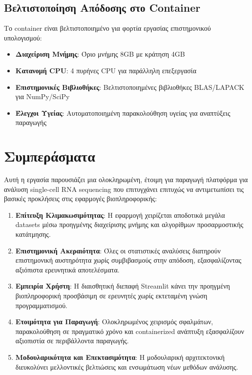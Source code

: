 \documentclass[11pt,a4paper]{article}
\begin{document}
\subsection{Βελτιστοποίηση Απόδοσης στο Container}

Το container είναι βελτιστοποιημένο για φορτία εργασίας επιστημονικού υπολογισμού:

\begin{itemize}
    \item \textbf{Διαχείριση Μνήμης}: Όριο μνήμης 8GB με κράτηση 4GB
    \item \textbf{Κατανομή CPU}: 4 πυρήνες CPU για παράλληλη επεξεργασία
    \item \textbf{Επιστημονικές Βιβλιοθήκες}: Βελτιστοποιημένες βιβλιοθήκες BLAS/LAPACK για NumPy/SciPy
    \item \textbf{Έλεγχοι Υγείας}: Αυτοματοποιημένη παρακολούθηση υγείας για αναπτύξεις παραγωγής
\end{itemize}

\section{Συμπεράσματα}

Αυτή η εργασία παρουσιάζει μια ολοκληρωμένη, έτοιμη για παραγωγή πλατφόρμα για ανάλυση single-cell RNA sequencing που επιτυγχάνει επιτυχώς να αντιμετωπίσει τις βασικές προκλήσεις στις εφαρμογές βιοπληροφορικής:

\begin{enumerate}
    \item \textbf{Επίτευξη Κλιμακωσιμότητας}: Η εφαρμογή χειρίζεται αποδοτικά μεγάλα datasets μέσω προηγμένης διαχείρισης μνήμης και αλγορίθμων προσαρμοστικής κατάτμησης.
    
    \item \textbf{Επιστημονική Ακεραιότητα}: Όλες οι στατιστικές αναλύσεις διατηρούν επιστημονική αυστηρότητα χωρίς συμβιβασμούς στην απόδοση, εξασφαλίζοντας αξιόπιστα ερευνητικά αποτελέσματα.
    
    \item \textbf{Εμπειρία Χρήστη}: Η διαισθητική διεπαφή Streamlit κάνει την προηγμένη βιοπληροφορική προσβάσιμη σε ερευνητές χωρίς εκτεταμένη γνώση προγραμματισμού.
    
    \item \textbf{Ετοιμότητα για Παραγωγή}: Ολοκληρωμένος χειρισμός σφαλμάτων, παρακολούθηση σε πραγματικό χρόνο και containerized ανάπτυξη εξασφαλίζουν αξιοπιστία σε περιβάλλοντα παραγωγής.
    
    \item \textbf{Μοδουλαρικότητα και Επεκτασιμότητα}: Η μοδουλαρική αρχιτεκτονική διευκολύνει μελλοντικές βελτιώσεις και ενσωμάτωση νέων μεθόδων ανάλυσης.
\end{enumerate}
\end{document}
